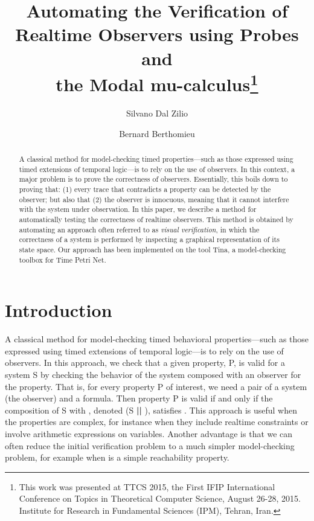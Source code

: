 \documentclass[a4paper]{scrartcl}
\def\code#1{\textsf{\small\bfseries #1}}
\def\vars#1{\textsf{\small #1}}
\begin{document}
\title{Automating the Verification of\\ Realtime Observers using
  Probes and\\ the Modal mu-calculus\thanks{This work was presented at TTCS 2015, the First IFIP International
Conference on Topics in Theoretical Computer Science, August 26-28,
2015.  Institute for Research in Fundamental Sciences (IPM), Tehran,
Iran.}}
\author[1,2]{Silvano Dal Zilio}
\author[1,2]{Bernard Berthomieu}
\date{}
\maketitle
\begin{abstract}
  A classical method for model-checking timed properties---such as
  those expressed using timed extensions of temporal logic---is to
  rely on the use of observers. In this context, a major problem is to
  prove the correctness of observers. Essentially, this boils down to
  proving that: (1) every trace that contradicts a property can be
  detected by the observer; but also that (2) the observer is
  innocuous, meaning that it cannot interfere with the system under
  observation. In this paper, we describe a method for automatically
  testing the correctness of realtime observers. This method is
  obtained by automating an approach often referred to as \emph{visual
    verification}, in which the correctness of a system is performed
  by inspecting a graphical representation of its state space. Our
  approach has been implemented on the tool Tina, a model-checking
  toolbox for Time Petri Net.
\end{abstract}



\section{Introduction}
\label{sec:introduction}

A classical method for model-checking timed behavioral
properties---such as those expressed using timed extensions of
temporal logic---is to rely on the use of observers. In this approach,
we check that a given property, \vars{P}, is valid for a system
\vars{S} by checking the behavior of the system composed with an
observer for the property. That is, for every property \vars{P} of
interest, we need a pair  of a system (the
observer) and a formula. Then property \vars{P} is valid if and only
if the composition of \vars{S} with , denoted (\vars{S}
\code{||} ), satisfies . This approach is
useful when the properties are complex, for instance when they include
realtime constraints or involve arithmetic expressions on
variables. Another advantage is that we can often reduce the initial
verification problem to a much simpler model-checking problem, for
example when  is a simple reachability property.
\end{document}
